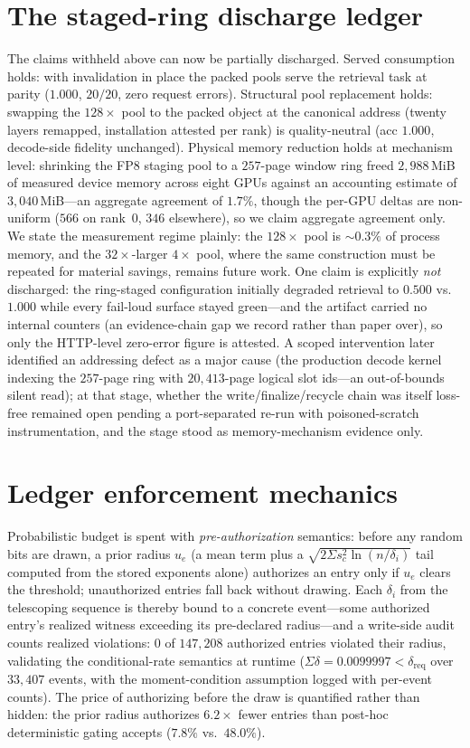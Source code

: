 \documentclass[11pt]{article}
\begin{document}
\section{The staged-ring discharge ledger}
\label{app:discharge}
The claims withheld above can now be partially discharged. Served consumption
holds: with invalidation in place the packed pools serve the retrieval task at
parity ($1.000$, $20/20$, zero request errors). Structural pool replacement
holds: swapping the $128\times$ pool to the packed object at the canonical
address (twenty layers remapped, installation attested per rank) is
quality-neutral (acc $1.000$, decode-side fidelity unchanged). Physical
memory reduction holds at mechanism level: shrinking the FP8 staging pool to
a $257$-page window ring freed $2{,}988$\,MiB of measured device memory
across eight GPUs against an accounting estimate of $3{,}040$\,MiB---an
aggregate agreement of $1.7\%$, though the per-GPU deltas are non-uniform
($566$ on rank~0, $346$ elsewhere), so we claim aggregate agreement only.
We state the measurement regime plainly: the $128\times$
pool is ${\sim}0.3\%$ of process memory, and the $32\times$-larger $4\times$
pool, where the same construction must be repeated for material savings,
remains future work. One claim is explicitly \emph{not} discharged: the
ring-staged configuration initially degraded retrieval to $0.500$ vs.\
$1.000$ while every fail-loud surface stayed green---and the artifact
carried no internal counters (an evidence-chain gap we record rather than
paper over), so only the HTTP-level zero-error figure is attested. A
scoped intervention later identified an addressing defect as a major cause
(the production decode kernel indexing the $257$-page ring with
$20{,}413$-page logical slot ids---an out-of-bounds silent read); at that
stage, whether the write/finalize/recycle chain was itself loss-free
remained open pending a port-separated re-run with poisoned-scratch
instrumentation, and the stage stood as memory-mechanism evidence only.

\section{Ledger enforcement mechanics}
\label{app:ledgermech}
Probabilistic budget is spent with \emph{pre-authorization} semantics: before any
random bits are drawn, a prior radius $u_e$ (a mean term plus a
$\sqrt{2\Sigma s_c^2\ln(n/\delta_i)}$ tail computed from the stored exponents
alone) authorizes an entry only if $u_e$ clears the threshold; unauthorized
entries fall back without drawing. Each $\delta_i$ from the telescoping sequence
is thereby bound to a concrete event---some authorized entry's realized witness
exceeding its pre-declared radius---and a write-side audit counts realized
violations: $0$ of $147{,}208$ authorized entries violated their radius,
validating the conditional-rate semantics at runtime
($\Sigma\delta=0.0099997<\delta_{\mathrm{req}}$ over $33{,}407$ events,
with the moment-condition assumption logged with per-event counts). The price of
authorizing before the draw is quantified rather than hidden: the prior radius
authorizes $6.2\times$ fewer entries than post-hoc deterministic gating
accepts ($7.8\%$ vs.\ $48.0\%$).
\end{document}
